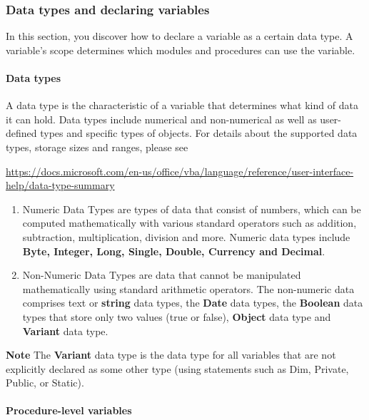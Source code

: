 \documentclass[
]{article}
\theoremstyle{definition}
\theoremstyle{definition}
\theoremstyle{definition}
\theoremstyle{definition}
\theoremstyle{remark}
\begin{document}
\hypertarget{data-types-and-declaring-variables}{%
\subsubsection{Data types and declaring variables}\label{data-types-and-declaring-variables}}

In this section, you discover how to declare a variable as a certain
data type. A variable's scope determines which modules and procedures
can use the variable.

\hypertarget{data-types}{%
\paragraph{Data types}\label{data-types}}

A data type is the characteristic of a variable that determines what kind of data it can hold. Data types include numerical and non-numerical
as well as user-defined types and specific types of objects. For details
about the supported data types, storage sizes and ranges, please see

\url{https://docs.microsoft.com/en-us/office/vba/language/reference/user-interface-help/data-type-summary}

\begin{enumerate}
\def\labelenumi{\arabic{enumi}.}
\item
  Numeric Data Types are types of data that consist of numbers, which
  can be computed mathematically with various standard operators such
  as addition, subtraction, multiplication, division and more. Numeric
  data types include \textbf{Byte, Integer, Long, Single, Double, Currency
  and Decimal}.
\item
  Non-Numeric Data Types are data that cannot be manipulated
  mathematically using standard arithmetic operators. The non-numeric
  data comprises text or \textbf{string} data types, the \textbf{Date} data
  types, the \textbf{Boolean} data types that store only two values (true
  or false), \textbf{Object} data type and \textbf{Variant} data type.
\end{enumerate}

\textbf{Note} The \textbf{Variant} data type is the data type for all variables
that are not explicitly declared as some other type (using statements
such as Dim, Private, Public, or Static).

\hypertarget{procedure-level-variables}{%
\paragraph{Procedure-level variables}\label{procedure-level-variables}}
\end{document}
